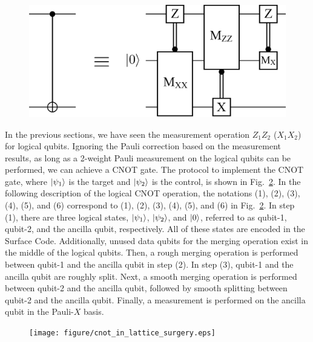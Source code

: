 \documentclass[a4paper,11pt]{ltjsarticle}
\begin{document}
{{        \begin{figure}[h]
            \centering
            \includegraphics[scale=0.30]{figure/logical_cnot.eps}
            \vspace{0pt}\caption{}
            \label{logical_cnot}
            \vspace{-10pt}
        \end{figure}

        In the previous sections, we have seen the measurement operation $Z_1Z_2$ ($X_1X_2$) for logical qubits. Ignoring the Pauli correction based on the measurement results, as long as a 2-weight Pauli measurement on the logical qubits can be performed, we can achieve a CNOT gate. The protocol to implement the CNOT gate, where $\ket{\psi_1}$ is the target and $\ket{\psi_2}$ is the control, is shown in Fig.~\ref{cnot_in_lattice_surgery}. In the following description of the logical CNOT operation, the notations (1), (2), (3), (4), (5), and (6) correspond to (1), (2), (3), (4), (5), and (6) in Fig.~\ref{cnot_in_lattice_surgery}. In step (1), there are three logical states, $\ket{\psi_1}$, $\ket{\psi_2}$, and $\ket{0}$, referred to as qubit-1, qubit-2, and the ancilla qubit, respectively. All of these states are encoded in the Surface Code. Additionally, unused data qubits for the merging operation exist in the middle of the logical qubits. Then, a rough merging operation is performed between qubit-1 and the ancilla qubit in step (2). In step (3), qubit-1 and the ancilla qubit are roughly split. Next, a smooth merging operation is performed between qubit-2 and the ancilla qubit, followed by smooth splitting between qubit-2 and the ancilla qubit. Finally, a measurement is performed on the ancilla qubit in the Pauli-$X$ basis. 

        \begin{figure}[h]
            \centering
            \texttt{[image: figure/cnot\_in\_lattice\_surgery.eps]}
            \vspace{0pt}\caption{}
            \label{cnot_in_lattice_surgery}
            \vspace{-10pt}
        \end{figure}

    }
}
\end{document}
